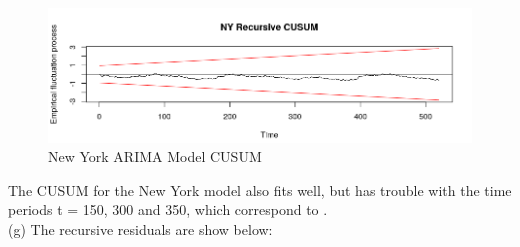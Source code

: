 \documentclass{article}
\begin{document}
\begin{figure}[H]
	
	\includegraphics[width=\linewidth]{ny_cusum}
	\caption{New York ARIMA Model CUSUM } 
\end{figure}
\noindent The CUSUM for the New York model also fits well, but has trouble with the time periods t = 150, 300 and 350, which correspond to . \\


\noindent (g) The recursive residuals are show below:
\end{document}
